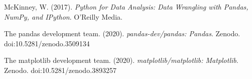 \documentclass[letterpaper]{article}
\newcommand\textstyleEmphasis[1]{\textit{#1}}
\begin{document}
\begin{multicols}{2}
{
\foreignlanguage{english}{McKinney, W. (2017). }\textstyleEmphasis{\foreignlanguage{english}{Python for Data Analysis:
Data Wrangling with Pandas, NumPy, and IPython}}\foreignlanguage{english}{. O'Reilly Media.}}


\bigskip

{
\foreignlanguage{english}{The pandas development team. (2020).
}\textstyleEmphasis{\foreignlanguage{english}{pandas-dev/pandas: Pandas}}\foreignlanguage{english}{. Zenodo.
doi:10.5281/zenodo.3509134}}


\bigskip

{
\foreignlanguage{english}{The matplotlib development team. (2020).
}\textstyleEmphasis{\foreignlanguage{english}{matplotlib/matplotlib: Matplotlib}}\foreignlanguage{english}{. Zenodo.
doi:10.5281/zenodo.3893257}}
\end{multicols}
\end{document}
